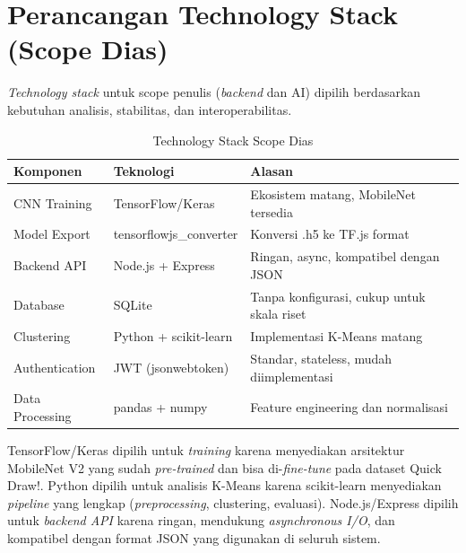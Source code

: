 \documentclass[10pt,twoside,openright]{report}
\begin{document}
\section{Perancangan Technology Stack (Scope Dias)}
\label{sec:perancangan-tech-stack}

\textit{Technology stack} untuk scope penulis (\textit{backend} dan AI) dipilih berdasarkan kebutuhan analisis, stabilitas, dan interoperabilitas.

\begin{table}[ht]
\centering
\caption{Technology Stack Scope Dias}
\label{tab:tech-stack-dias}
\begin{tabular}{|l|l|l|}
\hline
\textbf{Komponen} & \textbf{Teknologi} & \textbf{Alasan} \\ \hline
CNN Training & TensorFlow/Keras & Ekosistem matang, MobileNet tersedia \\ \hline
Model Export & tensorflowjs\_converter & Konversi .h5 ke TF.js format \\ \hline
Backend API & Node.js + Express & Ringan, async, kompatibel dengan JSON \\ \hline
Database & SQLite & Tanpa konfigurasi, cukup untuk skala riset \\ \hline
Clustering & Python + scikit-learn & Implementasi K-Means matang \\ \hline
Authentication & JWT (jsonwebtoken) & Standar, stateless, mudah diimplementasi \\ \hline
Data Processing & pandas + numpy & Feature engineering dan normalisasi \\ \hline
\end{tabular}
\end{table}

TensorFlow/Keras dipilih untuk \textit{training} karena menyediakan arsitektur MobileNet V2 yang sudah \textit{pre-trained} dan bisa di-\textit{fine-tune} pada dataset Quick Draw!. Python dipilih untuk analisis K-Means karena scikit-learn menyediakan \textit{pipeline} yang lengkap (\textit{preprocessing}, clustering, evaluasi). Node.js/Express dipilih untuk \textit{backend API} karena ringan, mendukung \textit{asynchronous I/O}, dan kompatibel dengan format JSON yang digunakan di seluruh sistem.

\end{document}
